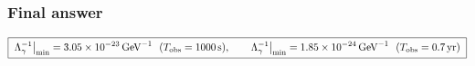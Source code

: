 \subsubsection*{Final answer}
{\color{blue}
\begin{equation*}
\boxed{\;\Lambda_\gamma^{-1}\big|_{\min}=3.05\times10^{-23}\,\mathrm{GeV}^{-1}\ \ (T_{\rm obs}=1000\,\mathrm{s}),\qquad
\Lambda_\gamma^{-1}\big|_{\min}=1.85\times10^{-24}\,\mathrm{GeV}^{-1}\ \ (T_{\rm obs}=0.7\,\mathrm{yr})\;}
\end{equation*}
}
